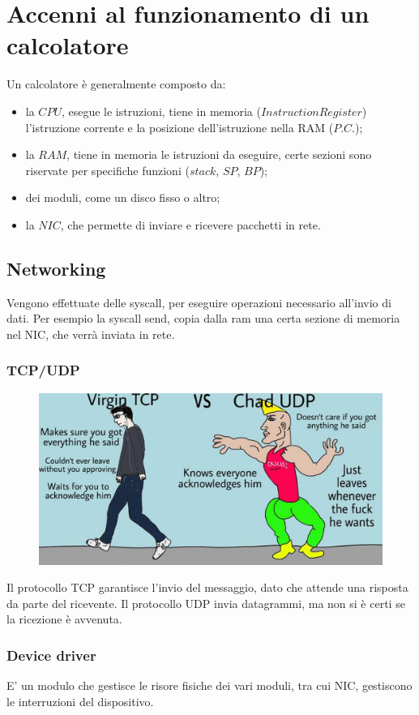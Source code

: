 \chapter{Accenni al funzionamento di un calcolatore}
Un calcolatore è generalmente composto da:
\begin{itemize}
  \item la $CPU$, esegue le istruzioni, tiene in memoria ($Instruction Register$)
    l'istruzione corrente e la posizione dell'istruzione nella RAM ($P.C.$);
  \item la $RAM$, tiene in memoria le istruzioni da eseguire, certe sezioni
    sono riservate per specifiche funzioni ($stack$, $SP$, $BP$);
  \item dei moduli, come un disco fisso o altro;
  \item la $NIC$, che permette di inviare e ricevere pacchetti in rete.
\end{itemize}

\section{Networking}
Vengono effettuate delle syscall, per eseguire operazioni necessario all'invio
di dati.
Per esempio la syscall send, copia dalla ram una certa sezione di memoria nel
NIC, che verrà inviata in rete.

\subsection{TCP/UDP}
\begin{figure}[t]
\includegraphics[width=.8\textwidth]{gfx/chadudp.jpg}
\centering
\end{figure}

Il protocollo TCP garantisce l'invio del messaggio, dato che attende una
risposta da parte del ricevente.
Il protocollo UDP invia datagrammi, ma non si è certi se la ricezione è
avvenuta.

\subsection{Device driver}
E' un modulo che gestisce le risore fisiche dei vari moduli, tra cui NIC,
gestiscono le interruzioni del dispositivo.

